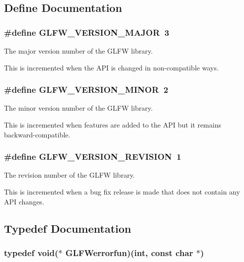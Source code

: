 \subsection{Define Documentation}
\hypertarget{group__init_g6337d9ea43b22fc529b2bba066b4a576}{
\subsubsection[GLFW\_\-VERSION\_\-MAJOR]{\setlength{\rightskip}{0pt plus 5cm}\#define GLFW\_\-VERSION\_\-MAJOR~3}}
\label{group__init_g6337d9ea43b22fc529b2bba066b4a576}


The major version number of the GLFW library. 

This is incremented when the API is changed in non-compatible ways. \hypertarget{group__init_gf80d40f0aea7088ff337606e9c48f7a3}{
\subsubsection[GLFW\_\-VERSION\_\-MINOR]{\setlength{\rightskip}{0pt plus 5cm}\#define GLFW\_\-VERSION\_\-MINOR~2}}
\label{group__init_gf80d40f0aea7088ff337606e9c48f7a3}


The minor version number of the GLFW library. 

This is incremented when features are added to the API but it remains backward-compatible. \hypertarget{group__init_gb72ae2e2035d9ea461abc3495eac0502}{
\subsubsection[GLFW\_\-VERSION\_\-REVISION]{\setlength{\rightskip}{0pt plus 5cm}\#define GLFW\_\-VERSION\_\-REVISION~1}}
\label{group__init_gb72ae2e2035d9ea461abc3495eac0502}


The revision number of the GLFW library. 

This is incremented when a bug fix release is made that does not contain any API changes. 

\subsection{Typedef Documentation}
\hypertarget{group__init_g6f2c8574259246a83b1d0c3baf23046f}{
\subsubsection[GLFWerrorfun]{\setlength{\rightskip}{0pt plus 5cm}typedef void($\ast$  {\bf GLFWerrorfun})(int, const char $\ast$)}}
\label{group__init_g6f2c8574259246a83b1d0c3baf23046f}



